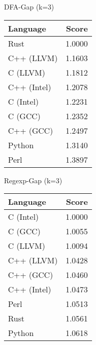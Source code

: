 \begin{subtable}{0.33\textwidth}
    \centering
    \caption{DFA-Gap (k=3)}
    \label{table:energy:dfa_gap(3)}
    \begin{tabular}{|l|r|}
        \hline
        Language & Score \\
        \hline
        Rust & 1.0000 \\
        C++ (LLVM) & 1.1603 \\
        C (LLVM) & 1.1812 \\
        C++ (Intel) & 1.2078 \\
        C (Intel) & 1.2231 \\
        C (GCC) & 1.2352 \\
        C++ (GCC) & 1.2497 \\
        Python & 1.3140 \\
        Perl & 1.3897 \\
        \hline
    \end{tabular}
\end{subtable}%
\begin{subtable}{0.33\textwidth}
    \centering
    \caption{Regexp-Gap (k=3)}
    \label{table:energy:regexp(3)}
    \begin{tabular}{|l|r|}
        \hline
        Language & Score \\
        \hline
        C (Intel) & 1.0000 \\
        C (GCC) & 1.0055 \\
        C (LLVM) & 1.0094 \\
        C++ (LLVM) & 1.0428 \\
        C++ (GCC) & 1.0460 \\
        C++ (Intel) & 1.0473 \\
        Perl & 1.0513 \\
        Rust & 1.0561 \\
        Python & 1.0618 \\
        \hline
    \end{tabular}
\end{subtable}
